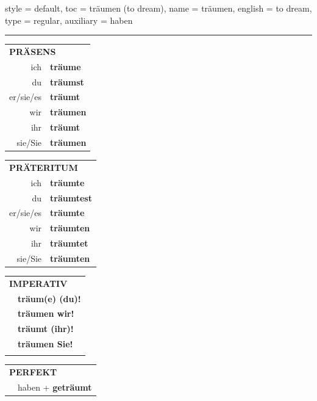 \begin{verbentry}{
  style = {default},
  toc = {träumen (to dream)},
  name = {träumen},
  english = {to dream},
  type = {regular},
  auxiliary = {haben}
}
 
    
     \vspace{5pt}

    \hrule
    
    \vspace{5pt}

  \begin{tabular}{rl}
     \multicolumn{2}{l}{\textbf{PRÄSENS} }\\
    ich & \textbf{träume}\\
    du & \textbf{träumst}\\
    er/sie/es & \textbf{träumt}\\
    wir & \textbf{träumen}\\
    ihr & \textbf{träumt}\\
    sie/Sie & \textbf{träumen}\\
  \end{tabular}
  \hfill
     \begin{tabular}{rl}
    \multicolumn{2}{l}{\textbf{PRÄTERITUM} }\\
    ich & \textbf{träumte}\\
    du & \textbf{träumtest}\\
    er/sie/es & \textbf{träumte}\\
    wir & \textbf{träumten}\\
    ihr & \textbf{träumtet}\\
    sie/Sie & \textbf{träumten}\\
  \end{tabular}
  \hfill
  \begin{tabular}{rl}
     \multicolumn{2}{l}{\textbf{IMPERATIV} }\\
   & \textbf{träum(e) (du)!}\\
   & \textbf{träumen wir!}\\
   & \textbf{träumt (ihr)!}\\
   & \textbf{träumen Sie!}\\
   & \vspace{10pt}
  \end{tabular}

    \vspace{10pt}

 \begin{tabular}{rl}
     \multicolumn{2}{l}{\textbf{PERFEKT}}\\
   & haben + \textbf{geträumt}\\
  \end{tabular}
\hfill
   \begin{tabular}{rl}
   

\end{tabular}
\end{verbentry}
